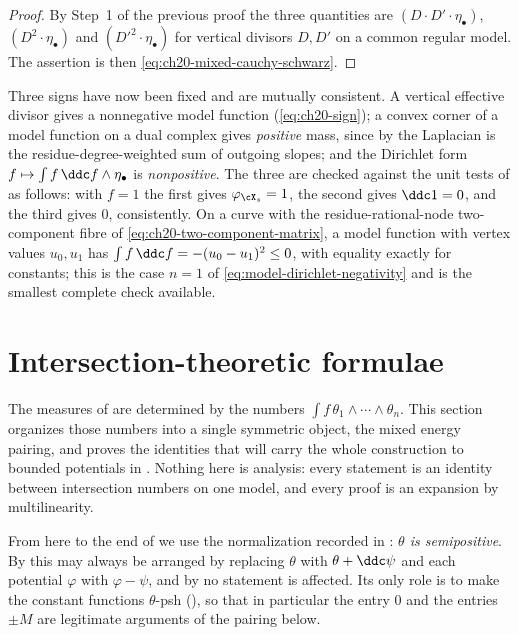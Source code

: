 \begin{proof}
By Step~1 of the previous proof the three quantities are
\((D\cdot D'\cdot\eta_\bullet)\), \((D^2\cdot\eta_\bullet)\) and
\((D'^2\cdot\eta_\bullet)\) for vertical divisors \(D,D'\) on a common
regular model.  The assertion is then
\eqref{eq:ch20-mixed-cauchy-schwarz}.
\end{proof}

\begin{remark}
\label{rem:ch24-sign-audit}
Three signs have now been fixed and are mutually consistent.  A vertical
effective divisor gives a nonnegative model function
(\eqref{eq:ch20-sign}); a convex corner of a model function on a dual
complex gives \emph{positive} mass, since by
 the Laplacian is the residue-degree-weighted
sum of outgoing slopes; and the Dirichlet form
\(f\mapsto\int f\,\ddc f\wedge\eta_\bullet\) is \emph{nonpositive}.  The
three are checked against the unit tests of  as
follows: with \(f=1\) the first gives \(\varphi_{\cX_s}=1\), the second
gives \(\ddc1=0\), and the third gives \(0\), consistently.  On a curve
with the residue-rational-node two-component fibre of
\eqref{eq:ch20-two-component-matrix}, a model function with vertex
values \(u_0,u_1\) has
\(\int f\,\ddc f=-(u_0-u_1)^2\leq0\), with equality exactly for constants;
this is the case \(n=1\) of \eqref{eq:model-dirichlet-negativity} and is the
smallest complete check available.
\end{remark}

\section{Intersection-theoretic formulae}
\label{sec:ch24-formulae}

The measures of  are determined by the numbers
\(\int f\,\theta_1\wedge\cdots\wedge\theta_n\).  This section organizes those
numbers into a single symmetric object, the mixed energy pairing, and
proves the identities that will carry the whole construction to bounded
potentials in .  Nothing here is analysis: every
statement is an identity between intersection numbers on one model, and
every proof is an expansion by multilinearity.

From here to the end of  we use the normalization
recorded in : \emph{\(\theta\) is semipositive}.
By  this may always be arranged by
replacing \(\theta\) with \(\theta+\ddc\psi\) and each potential
\(\varphi\) with \(\varphi-\psi\), and by
 no statement is affected.  Its only
role is to make the constant functions \(\theta\)-psh
(), so that in particular the entry \(0\) and the
entries \(\pm M\) are legitimate arguments of the pairing below.

